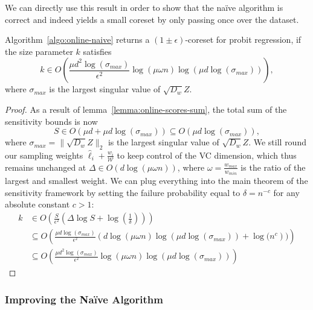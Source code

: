 We can directly use this result in order to show that the na\"ive
algorithm is correct and indeed yields a small coreset by
only passing once over the dataset.

\begin{theorem}
    Algorithm~\ref{algo:online-naive} returns a $(1 \pm \epsilon)$-coreset
    for probit regression, if the size parameter $k$ satisfies
    \begin{equation*}
        k \in O\left(\frac{\mu d^2 \log(\sigma_{max})}{\epsilon^2}\log(\mu \omega n) \log(\mu d \log(\sigma_{max}))\right),
    \end{equation*}
    where $\sigma_{max}$ is the largest singular value of $\sqrt{D_w}Z$.
\end{theorem}
\begin{proof}
    As a result of lemma~\ref{lemma:online-scores-sum},
    the total sum of the sensitivity bounds is now
    \begin{equation*}
        S \in O(\mu d + \mu d \log(\sigma_{max}))
        \subseteq O(\mu d \log(\sigma_{max})),
    \end{equation*}
    where $\sigma_{max} = \lVert \sqrt{D_w}Z \rVert_2$ is
    the largest singular value of $\sqrt{D_w}Z$.
    We still round our sampling weights
    $\hat{\ell}_i + \frac{w_i}{\mathcal{W}}$ to keep control of the
    VC dimension, which thus remains unchanged at
    $\Delta \in O(d\log(\mu\omega n))$, where
    $\omega = \frac{w_{max}}{w_{min}}$ is the ratio of the
    largest and smallest weight.
    We can plug everything into the main theorem of the sensitivity
    framework by setting the failure probability equal to
    $\delta = n^{-c}$ for any absolute constant $c > 1$:
    \begin{align*}
        k & \in O\left( \frac{S}{\epsilon^2} \left(\Delta \log S + \log\left(\frac{1}{\delta}\right)\right)\right)                 \\
          & \subseteq O\left(\frac{\mu d \log(\sigma_{max}) }
            {\epsilon^2}\left(d \log(\mu \omega n) \log(\mu d \log(\sigma_{max})) +
            \log(n^c\right))\right)                                                                                                \\
          & \subseteq O\left(\frac{\mu d^2 \log(\sigma_{max})}{\epsilon^2}\log(\mu \omega n) \log(\mu d \log(\sigma_{max}))\right)
    \end{align*}
\end{proof}

\subsubsection{Improving the Na\"ive Algorithm}

